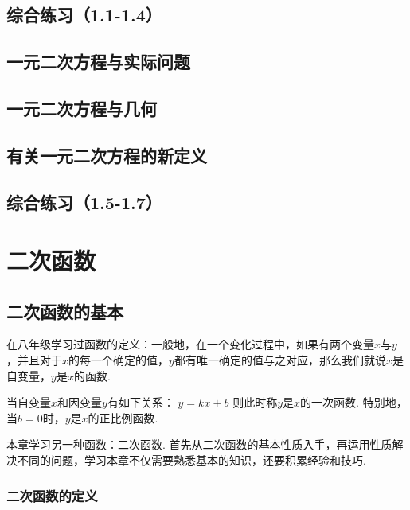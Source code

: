 \documentclass[lang=cn, 10pt, titlestyle=display, oneside, toc=twocol]{elegantbook}
\begin{document}
\section{综合练习（1.1-1.4）}





\section{一元二次方程与实际问题}

\section{一元二次方程与几何}

\section{有关一元二次方程的新定义}

\section{综合练习（1.5-1.7）}



\chapter{二次函数}

\section{二次函数的基本}

在八年级学习过函数的定义：一般地，在一个变化过程中，如果有两个变量\(x\)与\(y\)，并且对于\(x\)的每一个确定的值，\(y\)都有唯一确定的值与之对应，那么我们就说\(x\)是自变量，\(y\)是\(x\)的函数.
\par
当自变量\(x\)和因变量\(y\)有如下关系：
\(y=kx+b\)
则此时称\(y\)是\(x\)的一次函数. 特别地，当\(b=0\)时，\(y\)是\(x\)的正比例函数.
\par
本章学习另一种函数：二次函数. 首先从二次函数的基本性质入手，再运用性质解决不同的问题，学习本章不仅需要熟悉基本的知识，还要积累经验和技巧.


\subsection{二次函数的定义}
\end{document}

